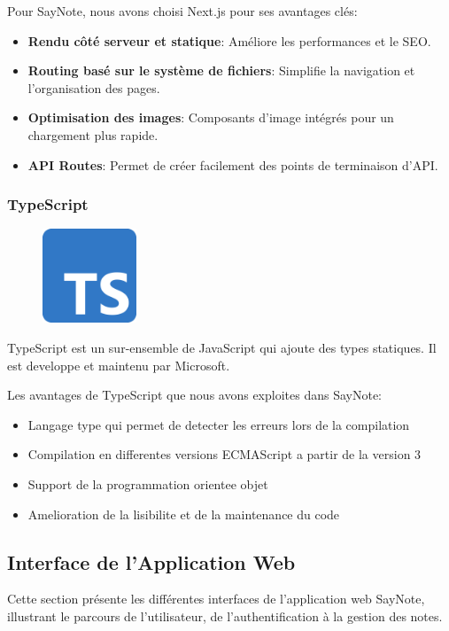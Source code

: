 Pour SayNote, nous avons choisi Next.js pour ses avantages clés:
\begin{itemize}
    \item \textbf{Rendu côté serveur et statique}: Améliore les performances et le SEO.
    \item \textbf{Routing basé sur le système de fichiers}: Simplifie la navigation et l'organisation des pages.
    \item \textbf{Optimisation des images}: Composants d'image intégrés pour un chargement plus rapide.
    \item \textbf{API Routes}: Permet de créer facilement des points de terminaison d'API.
\end{itemize}

\subsubsection{TypeScript}
\begin{figure}
    \centering
    \includegraphics[width=0.25\textwidth]{assets/docs/typescript.png}
\end{figure}
TypeScript est un sur-ensemble de JavaScript qui ajoute des types statiques. Il est developpe et maintenu par Microsoft.

Les avantages de TypeScript que nous avons exploites dans SayNote:
\begin{itemize}
    \item Langage type qui permet de detecter les erreurs lors de la compilation
    \item Compilation en differentes versions ECMAScript a partir de la version 3
    \item Support de la programmation orientee objet
    \item Amelioration de la lisibilite et de la maintenance du code
\end{itemize}

\subsection{Interface de l'Application Web}
Cette section présente les différentes interfaces de l'application web SayNote, illustrant le parcours de l'utilisateur, de l'authentification à la gestion des notes.

